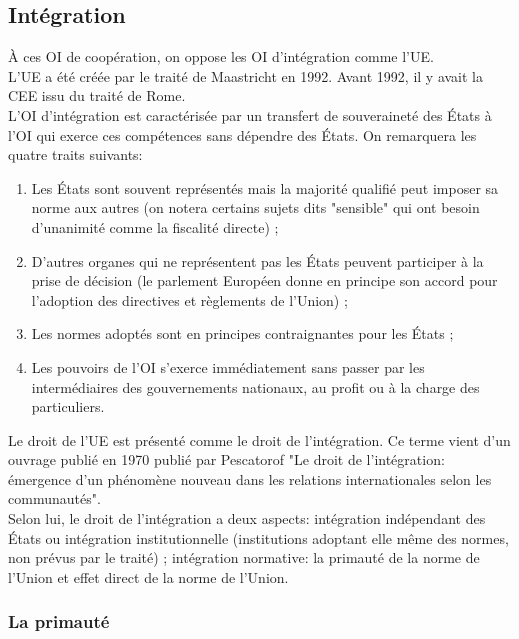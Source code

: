 \documentclass[12pt, a4paper, openany]{book}
\begin{document}
\subsection{Intégration}

À ces OI de coopération, on oppose les OI d'intégration comme l'UE. \\
L'UE a été créée par le traité de Maastricht en 1992. Avant 1992, il y avait la CEE issu du traité de Rome. \\
L'OI d'intégration est caractérisée par un transfert de souveraineté des États à l'OI qui exerce ces compétences sans dépendre des États. On remarquera les quatre traits suivants:
\begin{enumerate}
\item Les États sont souvent représentés mais la majorité qualifié peut imposer sa norme aux autres (on notera certains sujets dits "sensible" qui ont besoin d'unanimité comme la fiscalité directe) ;
\item D'autres organes qui ne représentent pas les États peuvent participer à la prise de décision (le parlement Européen donne en principe son accord pour l'adoption des directives et règlements de l'Union) ;
\item Les normes adoptés sont en principes contraignantes pour les États ;
\item Les pouvoirs de l'OI s'exerce immédiatement sans passer par les intermédiaires des gouvernements nationaux, au profit ou à la charge des particuliers.
\end{enumerate}


Le droit de l'UE est présenté comme le droit de l'intégration. Ce terme vient d'un ouvrage publié en 1970 publié par Pescatorof "Le droit de l'intégration: émergence d'un phénomène nouveau dans les relations internationales selon les communautés". \\
Selon lui, le droit de l'intégration a deux aspects: intégration indépendant des États ou intégration institutionnelle (institutions adoptant elle même des normes, non prévus par le traité) ; intégration normative: la primauté de la norme de l'Union et effet direct de la norme de l'Union.

\subsubsection{La primauté} 
 
\end{document}

